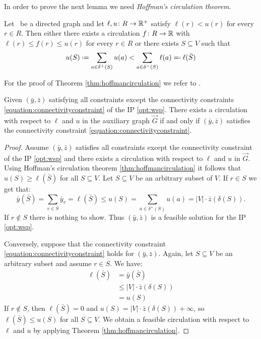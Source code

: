 In order to prove the next lemma we need \textit{Hoffman’s circulation theorem}.

\begin{theorem}
	\label{thm:hoffmancirculation}
	Let \graph\ be a directed graph and let $\ell, u \colon R \to \mathbb{R}^+$ satisfy $\ell(r) < u(r)$ for every $r \in R$. Then either there exists a circulation $f \colon R \to \mathbb{R}$ with $\ell(r) \leq f(r) \leq u(r)$ for every $r \in R$ or there exists $S \subseteq V$ such that
	$$u(S) \defeq \sum_{a \in \delta^+(S)} u(a) < \sum_{a \in \delta^-(S)} \ell(a) \eqdef \ell(\bar{S})$$
\end{theorem}

For the proof of Theorem \ref{thm:hoffmancirculation} we refer to \cite{AMO93}.

\begin{lemma}
	\label{lemma:circulation}
	Given $(\bar{y}, \bar{z})$ satisfying all constraints except the connectivity constraints \eqref{equation:connectivityconstraint} of the IP \eqref{opt:wsp}. There exists a circulation with respect to $\ell$ and $u$ in the auxiliary graph $\overrightarrow{G}$ if and only if $(\bar{y}, \bar{z})$ satisfies the connectivity constraint \eqref{equation:connectivityconstraint}.
\end{lemma}

\begin{proof}
	Assume $(\bar{y}, \bar{z})$ satisfies all constraints except the connectivity constraint of the IP \eqref{opt:wsp} and there exists a circulation with respect to $\ell$ and $u$ in $\overrightarrow{G}$. Using Hoffman’s circulation theorem \ref{thm:hoffmancirculation} it follows that $u(S) \geq \ell(\bar{S})$ for all $S \subseteq V$. Let $S \subseteq V$ be an arbitrary subset of $V$. If $r \in S$ we get that:
	$$\bar{y}(\bar{S}) = \sum_{v \in \bar{S}} \bar{y}_v = \ell(\bar{S}) \leq u(S) = \sum_{a \in \delta^+(S)} u(a) = |V| \cdot \bar{z}(\delta(S)).$$
	If $r \notin S$ there is nothing to show. Thus $(\bar{y}, \bar{z})$ is a feasible solution for the IP \eqref{opt:wsp}.\medskip
	
	Conversely, suppose that the connectivity constraint \eqref{equation:connectivityconstraint} holds for $(\bar{y}, \bar{z})$. Again, let $S \subseteq V$ be an arbitrary subset and assume $r \in S$. We have:
	\begin{align*}
		\ell(\bar{S}) &= \bar{y}(\bar{S})\\
		&\leq |V| \cdot \bar{z}(\delta(S))\\
		&= u(S)
	\end{align*}	
	If $r \notin S$, then $\ell(\bar{S}) = 0$ and $u(S) = |V| \cdot \bar{z}(\delta(S)) + \infty$, so $\ell(\bar{S}) \leq u(S)$ for all $S \subseteq V$. We obtain a feasible circulation with respect to $\ell$ and $u$ by applying Theorem \ref{thm:hoffmancirculation}.
\end{proof}

